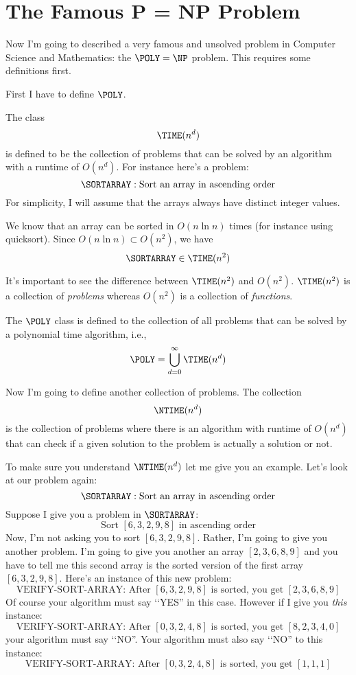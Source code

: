 \section{The Famous P = NP Problem}


Now I'm going to described a very famous and unsolved problem
in Computer Science and Mathematics:
the $\POLY = \NP$ problem.
This requires some definitions first.

First I have to define $\POLY$.

The class
\[
\TIME(n^d)
\]
is defined to be the collection of problems that can be solved by 
an algorithm with a runtime of $O(n^d)$.
For instance
here's a problem:
\[
\SORTARRAY:
\text{Sort an array in ascending order}
\]
For simplicity, 
I will assume that the arrays always have distinct integer values.

We know that an array can be sorted in $O(n \ln n)$ times
(for instance using quicksort).
Since $O(n \ln n) \subset O(n^2)$,
we have
\[
\SORTARRAY \in \TIME(n^2)
\]

It's important to see the difference between 
$\TIME(n^2)$ and 
$O(n^2)$.
$\TIME(n^2)$ is a collection of {\it problems}
whereas $O(n^2)$ is a collection of {\it functions}.

The $\POLY$ class is defined to the 
collection of all problems that can be solved by 
a polynomial time algorithm, i.e.,
\[
\POLY = \bigcup_{d = 0}^\infty \TIME(n^d)
\]

Now I'm going to define another collection of problems.
The collection
\[
\NTIME(n^d)
\]
is the collection of problems where there is an algorithm
with runtime of $O(n^d)$ that can check if a given solution to the 
problem is actually a solution or not.

To make sure you understand $\NTIME(n^d)$ let me give you an example.
Let's look at our problem again:
\[
\SORTARRAY:
\text{Sort an array in ascending order}
\]
Suppose I give you a problem in $\SORTARRAY$:
\[
\text{Sort $[6, 3, 2, 9, 8]$ in ascending order}
\]
Now, I'm not asking you to sort $[6,3,2,9,8]$.
Rather, I'm going to give you another problem.
I'm going to give you another an array 
$[2,3,6,8,9]$ and you have to tell me
this second array is the sorted version of the first
array $[6,3,2,9,8]$.
Here's an instance of this new problem:
\[
\text{VERIFY-SORT-ARRAY: 
After $[6, 3, 2, 9, 8]$ is sorted, you get $[2,3,6,8,9]$}
\]
Of course your algorithm must say \lq\lq YES'' in this case.
However if I give you {\it this} instance:
\[
\text{VERIFY-SORT-ARRAY: 
After $[0, 3, 2, 4, 8]$ is sorted, you get $[8,2,3,4,0]$}
\]
your algorithm must say \lq\lq NO''.
Your algorithm must also say \lq\lq NO'' to this instance:
\[
\text{VERIFY-SORT-ARRAY: 
After $[0, 3, 2, 4, 8]$ is sorted, you get $[1,1,1]$}
\]

